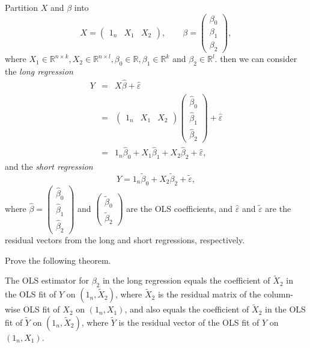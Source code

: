 Partition $X$ and $\beta$ into
\[
X=\left(\begin{array}{ccc}
1_n & X_{1} & X_{2}\end{array}\right),\qquad
\beta=\left(\begin{array}{c}
\beta_0 \\
\beta_{1}\\
\beta_{2}
\end{array}\right),
\]
where $X_{1}\in\mathbb{R}^{n\times k},X_{2}\in\mathbb{R}^{n\times l},  \beta_0 \in \mathbb{R},  \beta_{1}\in\mathbb{R}^{k}$ and $\beta_2 \in  \mathbb{R}^{l}$.  then we can consider the {\it long regression} 
\begin{eqnarray*}
Y &=& X\hat{\beta}+\hat{\varepsilon} \\
&=& \left(\begin{array}{ccc}
1_n & X_{1} & X_{2}\end{array}\right)\left(\begin{array}{c}
\hat{\beta}_0 \\
\hat{\beta}_{1}\\
\hat{\beta}_{2}
\end{array}\right)+\hat{\varepsilon} \\
&=& 1_n \hat{\beta}_0 +  X_{1}\hat{\beta}_{1}+X_{2}\hat{\beta}_{2}+\hat{\varepsilon},
\end{eqnarray*}
 and the {\it short regression} 
\[
Y= 1_n \tilde{\beta}_0  +   X_{2}\tilde{\beta}_{2}+\tilde{\varepsilon},
\]
where $\hat{\beta}=\left(\begin{array}{c}
\hat{\beta}_0 \\ 
\hat{\beta}_{1}\\
\hat{\beta}_{2}
\end{array}\right)$ and
$
\left(\begin{array}{c}
\tilde{\beta}_{0}\\
\tilde{\beta}_{2}
\end{array}\right)
$ are the OLS coefficients, and $\hat{\varepsilon}$
and $\tilde{\varepsilon}$ are the residual vectors from the long
and short regressions, respectively. 

Prove the following theorem.

\begin{theorem}
\label{thm:fwl2}The OLS estimator for $\beta_{2}$ in the long regression equals the coefficient of $\tilde{X}_{2}$ in the OLS fit of $Y$ on $(1_n,\tilde{X}_{2} )$, where $\tilde{X}_{2}$ is the residual matrix of the column-wise OLS fit of $X_2$ on $(1_n, X_1)$, and also equals the coefficient of $\tilde{X}_{2}$ in the OLS fit of $\tilde{Y}$ on $(1_n,\tilde{X}_{2} )$, where $\tilde{Y}$ is the residual vector of the OLS fit of $Y$ on $(1_n, X_1)$.
\end{theorem}



